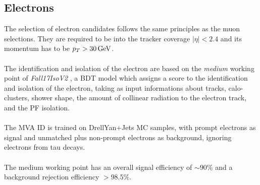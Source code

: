 \newpage
\subsection{Electrons}
The selection of electron candidates follows the same principles as the muon selections.
They are required to be into the tracker coverage $|\eta|<2.4$ and its momentum has to be $p_T>30 {\,\text{Ge\hspace{-.08em}V}}$.\\
\\
The identification and isolation of the electron are based on the \emph{medium} working point of \textit{Fall17IsoV2} \cite{2018ElectronConference}, a BDT model which assigns a score to the identification and isolation of the electron, taking as input informations about tracks, calo-clusters, shower shape, the amount of collinear radiation to the electron track, and the PF isolation.\\
\\
The MVA ID is trained on DrellYan+Jets MC samples, with prompt electrons as signal and unmatched plus non-prompt electrons as background, ignoring electrons from tau decays.\\
\\
The medium working point has an overall signal efficiency of $\sim 90\%$ and a background rejection efficiency $>98.5\%$.\\
